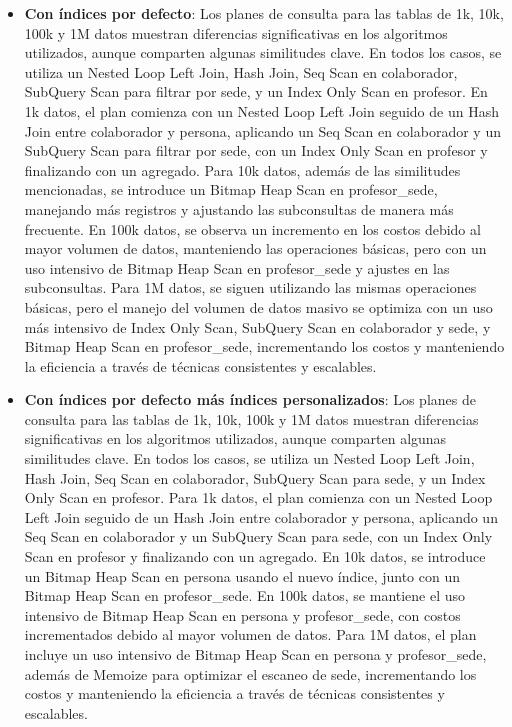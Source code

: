 \begin{itemize}
\begin{itemize}
		      \item {\textbf{Con índices por defecto}: Los planes de consulta para las tablas de 1k, 10k, 100k y 1M datos muestran diferencias significativas en los algoritmos utilizados, aunque comparten algunas similitudes clave. En todos los casos, se utiliza un Nested Loop Left Join, Hash Join, Seq Scan en colaborador, SubQuery Scan para filtrar por sede, y un Index Only Scan en profesor. En 1k datos, el plan comienza con un Nested Loop Left Join seguido de un Hash Join entre colaborador y persona, aplicando un Seq Scan en colaborador y un SubQuery Scan para filtrar por sede, con un Index Only Scan en profesor y finalizando con un agregado. Para 10k datos, además de las similitudes mencionadas, se introduce un Bitmap Heap Scan en profesor\_sede, manejando más registros y ajustando las subconsultas de manera más frecuente. En 100k datos, se observa un incremento en los costos debido al mayor volumen de datos, manteniendo las operaciones básicas, pero con un uso intensivo de Bitmap Heap Scan en profesor\_sede y ajustes en las subconsultas. Para 1M datos, se siguen utilizando las mismas operaciones básicas, pero el manejo del volumen de datos masivo se optimiza con un uso más intensivo de Index Only Scan, SubQuery Scan en colaborador y sede, y Bitmap Heap Scan en profesor\_sede, incrementando los costos y manteniendo la eficiencia a través de técnicas consistentes y escalables.}
		      \item {\textbf{Con índices por defecto más índices personalizados}: Los planes de consulta para las tablas de 1k, 10k, 100k y 1M datos muestran diferencias significativas en los algoritmos utilizados, aunque comparten algunas similitudes clave. En todos los casos, se utiliza un Nested Loop Left Join, Hash Join, Seq Scan en colaborador, SubQuery Scan para sede, y un Index Only Scan en profesor. Para 1k datos, el plan comienza con un Nested Loop Left Join seguido de un Hash Join entre colaborador y persona, aplicando un Seq Scan en colaborador y un SubQuery Scan para sede, con un Index Only Scan en profesor y finalizando con un agregado. En 10k datos, se introduce un Bitmap Heap Scan en persona usando el nuevo índice, junto con un Bitmap Heap Scan en profesor\_sede. En 100k datos, se mantiene el uso intensivo de Bitmap Heap Scan en persona y profesor\_sede, con costos incrementados debido al mayor volumen de datos. Para 1M datos, el plan incluye un uso intensivo de Bitmap Heap Scan en persona y profesor\_sede, además de Memoize para optimizar el escaneo de sede, incrementando los costos y manteniendo la eficiencia a través de técnicas consistentes y escalables.}
	      \end{itemize}
\end{itemize}
